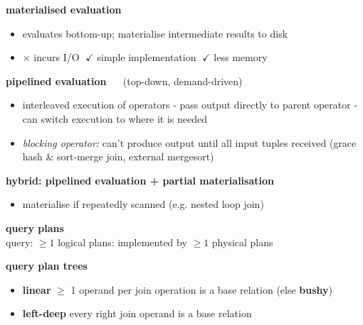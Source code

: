 \documentclass[10pt, landscape]{article}
\begin{document}
\begin{multicols*}{4}
  \textbf{materialised evaluation}

  \begin{itemize}
    \item evaluates bottom-up; materialise intermediate results to disk 
    \item $\times$ incurs I/O  $\;\checkmark$ simple implementation $\;\checkmark$ less memory
  \end{itemize}

  \textbf{pipelined evaluation} $\quad$ (top-down, demand-driven)

  \begin{itemize}
    \item interleaved execution of operators - pass output directly to parent operator - can switch execution to where it is needed
    \item \textit{blocking operator:} can't produce output until all input tuples received (grace hash \& sort-merge join, external mergesort)
  \end{itemize}


  \textbf{hybrid: pipelined evaluation + partial materialisation}


  \begin{itemize}
    \item materialise if repeatedly scanned (e.g. nested loop join)
  \end{itemize}


  \textbf{query plans}\\
   query: $\geq 1$ logical plans: implemented by $\geq 1$ physical plans

  \textbf{query plan trees}

  \begin{itemize}
    \item \textbf{linear} $\geq$ 1 operand per join operation is a base relation
      (else \textbf{bushy})
    \item \textbf{left-deep} every right join operand is a base relation
  \end{itemize}



\end{multicols*}
\end{document}
